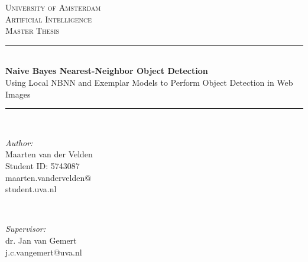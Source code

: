 \documentclass[a4paper,10pt]{report}
\begin{document}
\begin{titlepage}

\newcommand{\HRule}{\rule{\linewidth}{0.5mm}} %
\center %
 

\textsc{\LARGE University of Amsterdam}\\[1.0cm] %
\textsc{\Large Artificial Intelligence}\\[0.5cm] %
\textsc{\large Master Thesis}\\[0.5cm] %


\HRule \\[0.4cm]
{ \huge \bfseries Naive Bayes Nearest-Neighbor Object Detection}\\[0.1cm]
{ \large Using Local NBNN and Exemplar Models to Perform Object Detection in Web Images}\\[0.2cm]
\HRule \\[1.5cm]
 

\begin{minipage}{0.4\textwidth}
\begin{flushleft} \large
\emph{Author:}\\
Maarten van der Velden\\
Student ID: 5743087\\
maarten.vandervelden@\\student.uva.nl
\end{flushleft}
\end{minipage}
~
\begin{minipage}{0.4\textwidth}
\begin{flushright} \large
\emph{Supervisor:} \\
dr. Jan van Gemert\\
j.c.vangemert@uva.nl
\end{flushright}
\end{minipage}\\[2cm]


\end{titlepage}
\end{document}
